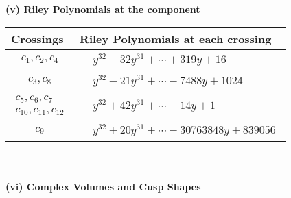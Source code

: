 \documentclass[1p]{elsarticle_modified}
\theoremstyle{definition}
\begin{document}
\newpage\renewcommand{\arraystretch}{1}
\flushleft \textbf{(v) Riley Polynomials at the component}\newline \\
\begin{tabular}{m{50pt}|m{274pt}}
Crossings & \hspace{64pt}Riley Polynomials at each crossing \\
\hline $$\begin{aligned}c_{1},c_{2},c_{4}\end{aligned}$$&$\begin{aligned}
&y^{32}-32 y^{31}+\cdots+319 y+16
\end{aligned}$\\
\hline $$\begin{aligned}c_{3},c_{8}\end{aligned}$$&$\begin{aligned}
&y^{32}-21 y^{31}+\cdots-7488 y+1024
\end{aligned}$\\
\hline $$\begin{aligned}c_{5},c_{6},c_{7}\\c_{10},c_{11},c_{12}\end{aligned}$$&$\begin{aligned}
&y^{32}+42 y^{31}+\cdots-14 y+1
\end{aligned}$\\
\hline $$\begin{aligned}c_{9}\end{aligned}$$&$\begin{aligned}
&y^{32}+20 y^{31}+\cdots-30763848 y+839056
\end{aligned}$\\
\hline
\end{tabular}\\~\\
\newpage\flushleft \textbf{(vi) Complex Volumes and Cusp Shapes}
\end{document}
